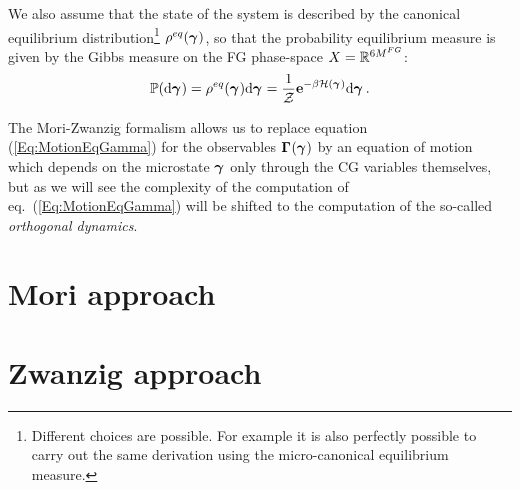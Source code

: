 \documentclass[10pt,a4paper]{book}
\theoremstyle{definition}
\begin{document}
We also assume that the state of the system is described by the canonical equilibrium distribution\footnote{Different choices are possible. For example it is also perfectly possible to carry out the same derivation using the micro-canonical equilibrium measure.} $\rho^{eq}(\boldsymbol\gamma_{})$, so that the probability equilibrium measure is given by the Gibbs measure on the FG phase-space $X=\mathbb{R}^{6M^{FG}}$:
\begin{equation}\label{Eq:GibbsMeas}
 \mathbb{P}(\mbox{d}\boldsymbol\gamma_{})=\rho^{eq}(\boldsymbol\gamma_{})\mbox{d}\boldsymbol\gamma_{}=\frac{1}{\mathcal{Z}}\mathbf{e}^{-\beta\mathcal{H}(\boldsymbol\gamma_{})}\mbox{d}\boldsymbol\gamma_{}\,.
\end{equation}

The Mori-Zwanzig formalism allows us to replace equation (\ref{Eq:MotionEqGamma}) for the observables $\boldsymbol\Gamma_{}(\boldsymbol\gamma_{})$ by an equation of motion which depends on the microstate $\boldsymbol\gamma_{}$ only through the CG variables themselves, but as we will see the complexity of the computation of eq.~(\ref{Eq:MotionEqGamma}) will be shifted to the computation of the so-called \emph{orthogonal dynamics}.


\section{Mori approach}
\label{Sec:MoriProj}

\section{Zwanzig approach}
\end{document}
